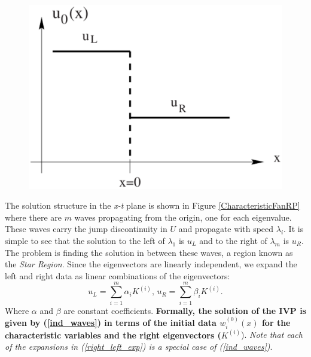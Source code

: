 \documentclass[]{article}
\begin{document}
		\begin{figure}[h] 	
			\centering
			\includegraphics[scale=.30]{RiemannProblem}
			\caption{}
			\label{RiemannProblem}
		\end{figure} 
		The solution structure in the \textit{x-t} plane is shown in Figure \ref{CharacteristicFanRP} where there are $ m $ waves propagating from the origin, one for each eigenvalue. These waves carry the jump discontinuity in $ U $ and propagate with speed $ \lambda_i $. It is simple to see that the solution to the left of $ \lambda_1 $ is $ u_L $ and to the right of $ \lambda_m $ is $ u_R $. The problem is finding the solution in between these waves, a region known as the \textit{Star Region}. Since the eigenvectors are linearly independent, we expand the left and right data as linear combinations of the eigenvectors:
		\begin{equation}
			u_L = \sum_{i = 1}^{m} \alpha_i K^{(i)} \mbox{,   } u_R = \sum_{i = 1}^{m} \beta_i K^{(i)}.
			\label{right_left_exp}
		\end{equation}
		Where $ \alpha $ and $ \beta $ are constant coefficients. \textbf{Formally, the solution of the IVP is given by (\ref{ind_waves}) in terms of the initial data $ w_i^{(0)}(x) $ for the characteristic variables  and the right eigenvectors ($ K^{(i)} $}). \textit{Note that each of the expansions in (\ref{right_left_exp}) is a special case of (\ref{ind_waves})}.
\end{document}
